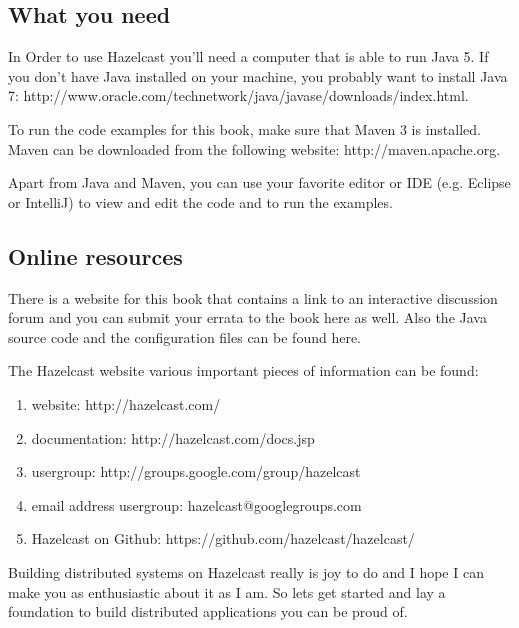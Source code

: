 \subsection*{What you need}
In Order to use Hazelcast you'll need a computer that is able to run Java 5. If you don't have Java installed on your machine, you probably want to install Java 7: 
http://www.oracle.com/technetwork/java/javase/downloads/index.html. 

To run the code examples for this book, make sure that Maven 3 is installed. Maven can be downloaded from the following website: http://maven.apache.org.

Apart from Java and Maven, you can use your favorite editor or IDE (e.g. Eclipse or IntelliJ) to  view and edit the code and to run the examples. 
\subsection*{Online resources}
There is a website for this book that contains a link to an interactive discussion forum and you can submit your errata to the book here as well. Also the Java source code and the configuration files can be found here. 

The Hazelcast website various important pieces of information can be found:
\begin{enumerate}
\item website: http://hazelcast.com/
\item documentation: http://hazelcast.com/docs.jsp
\item usergroup: http://groups.google.com/group/hazelcast
\item email address usergroup: hazelcast@googlegroups.com
\item Hazelcast on Github: https://github.com/hazelcast/hazelcast/
\end{enumerate}
Building distributed systems on Hazelcast really is joy to do and I hope I can make you as enthusiastic about it as I am. So lets get started and lay a foundation to build distributed applications you can be proud of.
